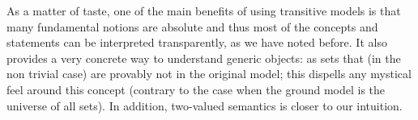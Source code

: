 As a matter of taste, one of the main benefits of using transitive
models is that many fundamental notions are absolute and thus most of
the concepts and statements can be interpreted transparently, as we
have noted before. It
also provides a very concrete way to understand generic objects: as
sets that (in the non trivial case) are provably not in the original
model; this dispells any mystical feel around this concept (contrary
to the case when the ground model is the universe of all sets). In
addition, two-valued semantics is closer to our intuition.

